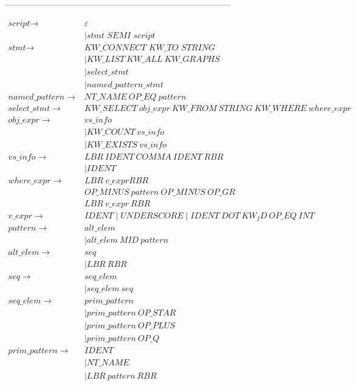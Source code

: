 --------------------------------------------------------------------------------
%




\begin{align*}
\textit{script} \to & \varepsilon  \\
                    & \mid \textit{stmt \ SEMI \ script} \\
\textit{stmt} \to & \textit{KW\_CONNECT \ KW\_TO \ STRING} \\
                  & \mid KW\_LIST \ KW\_ALL \ KW\_GRAPHS \\
                  & \mid select\_stmt \\
                  & \mid named\_pattern\_stmt \\
named\_pattern \to & NT\_NAME \ OP\_EQ  \ pattern \\
select\_stmt \to & \textit{KW\_SELECT} \ obj\_expr \ \textit{KW\_FROM} \ STRING \ \textit{KW\_WHERE} \ where\_expr \\
obj\_expr \to & vs\_info \\
              & \mid \textit{KW\_COUNT} \ vs\_info \\
              & \mid \textit{KW\_EXISTS} \ vs\_info \\
vs\_info \to & LBR \ IDENT \ COMMA \ IDENT \ RBR \\
             & \mid IDENT \\
where\_expr \to & LBR \ v\_expr RBR \ \\
                & OP\_MINUS \ pattern \ OP\_MINUS \ OP\_GR \\
                & LBR \ v\_expr \ RBR \\
v\_expr \to & IDENT \mid UNDERSCORE \mid IDENT \ DOT \ KW_ID \ OP\_EQ \ INT \\
pattern \to & alt\_elem \\
            & \mid alt\_elem \ MID \ pattern \\
alt\_elem \to & seq \\
             & \mid LBR \ RBR \\
seq \to & seq\_elem \\
        & \mid seq\_elem \ seq \\
seq\_elem \to & prim\_pattern \\
              & \mid prim\_pattern \ OP\_STAR \\
              & \mid prim\_pattern \ OP\_PLUS \\
              & \mid prim\_pattern \ OP\_Q \\
prim\_pattern \to & IDENT \\
                 & \mid NT\_NAME \\
                 & \mid LBR \ pattern \ RBR \\
\end{align*}

